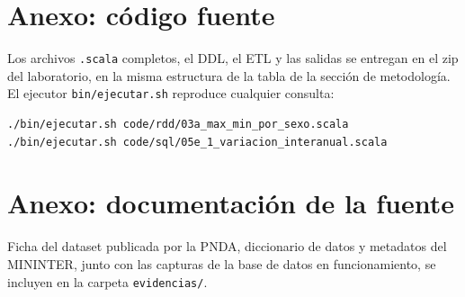 \documentclass[10pt,a4paper]{article}
\theoremstyle{definition}
\begin{document}
\appendix
\section{Anexo: c\'odigo fuente}
Los archivos \texttt{.scala} completos, el DDL, el ETL y las salidas se entregan en el zip del
laboratorio, en la misma estructura de la tabla de la secci\'on de metodolog\'ia. El ejecutor
\texttt{bin/ejecutar.sh} reproduce cualquier consulta:

\begin{lstlisting}[style=scala]
./bin/ejecutar.sh code/rdd/03a_max_min_por_sexo.scala
./bin/ejecutar.sh code/sql/05e_1_variacion_interanual.scala
\end{lstlisting}

\section{Anexo: documentaci\'on de la fuente}
Ficha del dataset publicada por la PNDA, diccionario de datos y metadatos del MININTER, junto con
las capturas de la base de datos en funcionamiento, se incluyen en la carpeta
\texttt{evidencias/}.
\end{document}
